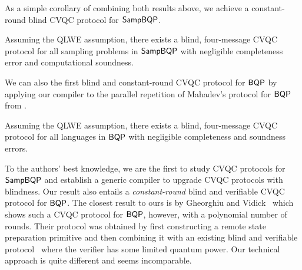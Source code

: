 As a simple corollary of combining both results above, we achieve a constant-round blind CVQC protocol for $\operatorname{\mathsf{SampBQP}}$. %
\begin{theorem}[informal]
        Assuming the QLWE assumption, there exists a blind, four-message CVQC protocol for all sampling problems in $\operatorname{\mathsf{SampBQP}}$ with negligible completeness error and computational soundness.
\end{theorem}

We can also the first blind and constant-round CVQC protocol for $\operatorname{\mathsf{BQP}}$ by applying our compiler to the parallel repetition of Mahadev's protocol for $\operatorname{\mathsf{BQP}}$ from \cite{arXiv:ChiaChungYam19, arXiv:AlaChiHun19}.


\begin{theorem}[informal]
    Assuming the QLWE assumption, there exists a blind, four-message CVQC protocol for all languages in $\operatorname{\mathsf{BQP}}$ with negligible completeness and soundness errors.
\end{theorem}




To the authors' best knowledge, we are the first to study CVQC protocols for $\operatorname{\mathsf{SampBQP}}$ and establish a generic compiler to upgrade CVQC protocols with blindness.
Our result also entails a \emph{constant-round} blind and verifiable CVQC protocol for $\operatorname{\mathsf{BQP}}$.
The closest result to ours is by Gheorghiu and Vidick~\cite{FOCS:GheVid19} which shows such a CVQC protocol for $\operatorname{\mathsf{BQP}}$, however, with a polynomial number of rounds.
Their protocol was obtained by first constructing a remote state preparation primitive and then combining it with an existing blind and verifiable protocol~\cite{FK17} where the verifier has some limited quantum power.
Our technical approach is quite different and seems incomparable.


